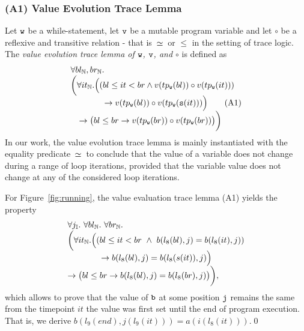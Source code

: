 
\subsubsection*{\textbf{(A1) Value Evolution Trace Lemma}} \label{lemma:valueEvolution}
Let $\texttt{w}$ be a while-statement, let $\texttt{v}$ be a mutable program
variable and let $\circ$ be a reflexive and transitive relation -
that is ${\,\simeq\,}$ or $\leq$ in the setting of trace logic. 
%
The \emph{value evolution trace lemma of $\texttt{w}$, $\texttt{v}$, and $\circ$} is defined as
\begin{equation}\label{eq:TLA1}
\begin{array}{l}
\forall bl_{\natsort}, br_{\natsort}.\\
\bigg( 
\forall it_{\natsort}. 
\Big(( bl\leq it < br \land v(tp_\pv{w}(bl)) \circ v(tp_\pv{w}(it))) 
\\  \qquad \qquad\limp v(tp_\pv{w}(bl)) \circ v(tp_\pv{w}(\suc(it)))\Big) \tag{A1}
\\\quad\limp 
\big( bl \leq br \limp v(tp_\pv{w}(br)) \circ v(tp_\pv{w}(br)) \big) %
\bigg) 
\end{array}
\end{equation}
%
In our work, the value evolution trace
lemma is mainly instantiated with
the equality predicate ${\,\simeq\,}$
to conclude that the value of a variable does not change during a
range of loop iterations, provided that the variable value does not
change at any of the considered loop iterations.

\begin{example}
	For Figure~\ref{fig:running}, the value evaluation trace lemma (A1) 
	yields the property
	\begin{equation*}\label{eq:running:evolution}
	\begin{array}{l}
	\forall j_{\mathbb{I}}.\ \forall bl_{\mathbb{N}}.\ \forall br_{\mathbb{N}}.\ \\
	\bigg( 
	\forall it_{\mathbb{N}}. \Big( (bl \leq it < br \ \wedge \  b(l_8(bl), j) = b(l_8(it), j) ) \\
	\qquad \qquad \rightarrow b(l_8(bl), j) = b(l_8(s(it)), j)
	\Big) \\ \rightarrow 
	\big( bl \leq br \rightarrow b(l_8(bl), j) = b(l_8(br), j) \big)
	\bigg), 
	\end{array}
	\end{equation*}
	which allows to prove that the value of $\texttt{b}$ at some position
	$\texttt{j}$
	remains the same from the timepoint $it$ the value was first set until
	the end of program execution. That is, we derive $b(l_9(end), j(l_9(it))) = a(i(l_8(it)))$.\qed
\end{example}

